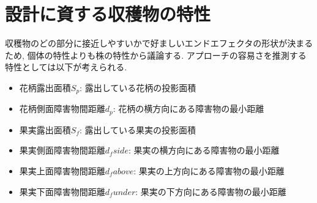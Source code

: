 \section{設計に資する収穫物の特性}
収穫物のどの部分に接近しやすいかで好ましいエンドエフェクタの形状が決まるため, 個体の特性よりも株の特性から議論する.
アプローチの容易さを推測する特性としては以下が考えられる.

\begin{itemize}
  \item 花柄露出面積$S_p$: 露出している花柄の投影面積
  \item 花柄側面障害物間距離$d_p$: 花柄の横方向にある障害物の最小距離
  \item 果実露出面積$S_f$: 露出している果実の投影面積
  \item 果実側面障害物間距離$d_fside$: 果実の横方向にある障害物の最小距離
  \item 果実上面障害物間距離$d_fabove$: 果実の上方向にある障害物の最小距離
  \item 果実下面障害物間距離$d_funder$: 果実の下方向にある障害物の最小距離
\end{itemize}

